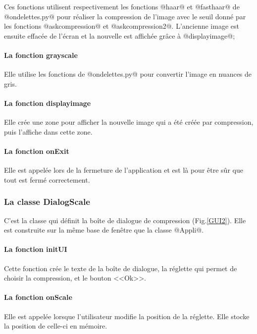 \documentclass{article}
\begin{document}
Ces fonctions utilisent respectivement les fonctions @haar@ et @fasthaar@ de @ondelettes.py@ pour réaliser la compression de l'image avec le seuil donné par les fonctions @askcompression@ et @askcompression2@. L'ancienne image est ensuite effacée de l'écran et la nouvelle est affichée grâce à @displayimage@;

\paragraph{La fonction grayscale}

Elle utilise les fonctions de @ondelettes.py@ pour convertir l'image en nuances de gris.

\paragraph{La fonction displayimage}

Elle crée une zone pour afficher la nouvelle image qui a été créée par compression, puis l'affiche dans cette zone.

\paragraph{La fonction onExit}

Elle est appelée lors de la fermeture de l'application et est là pour être sûr que tout est fermé correctement.


\subsubsection{La classe DialogScale}

C'est la classe qui définit la boîte de dialogue de compression (Fig.\ref{GUI2}). Elle est construite sur la même base de fenêtre que la classe @Appli@.

\paragraph{La fonction initUI}

Cette fonction crée le texte de la boîte de dialogue, la réglette qui permet de choisir la compression, et le bouton <<Ok>>.

\paragraph{La fonction onScale}

Elle est appelée lorsque l'utilisateur modifie la position de la réglette. Elle stocke la position de celle-ci en mémoire. 
\end{document}
